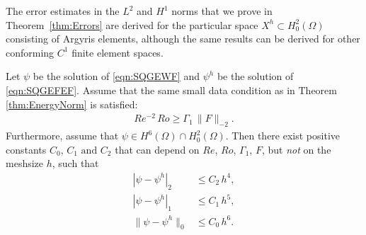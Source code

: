 The error estimates in the $L^2$ and $H^1$ norms that we prove in Theorem~\ref{thm:Errors} are
derived for the particular space $X^h\subset H^2_0(\Omega)$ consisting of Argyris elements, although
the same results can be derived for other conforming $C^1$ finite element spaces. 
\begin{theorem} \label{thm:Errors}
  Let $\psi$ be the solution of \eqref{eqn:SQGEWF} and $\psi^h$ be the solution
  of \eqref{eqn:SQGEFEF}. 
  Assume that the same small data condition as in Theorem \ref{thm:EnergyNorm} is satisfied:
  \begin{eqnarray}
  Re^{-2} \, Ro 
  \geq \Gamma_1 \, \| F \|_{-2} .
  \label{eqn:small_data_condition_dual}
  \end{eqnarray}
  Furthermore, assume that $\psi\in H^6(\Omega) \cap H^2_0(\Omega)$. 
  Then there exist positive constants $C_0, \, C_1 \text{ and } C_2$ that can depend on $Re$, $Ro$, $\Gamma_1$, $F$, but \emph{not} on the meshsize $h$, such that
  \begin{align}
    |\psi - \psi^h|_2 &\le C_2 \, h^4 , \label{eqn:H2Error} \\
    |\psi - \psi^h|_1 &\le C_1 \, h^5 , \label{eqn:H1Error} \\
    \|\psi - \psi^h\|_0 &\le C_0 \, h^6 . \label{eqn:L2Error}
  \end{align}
\end{theorem}

